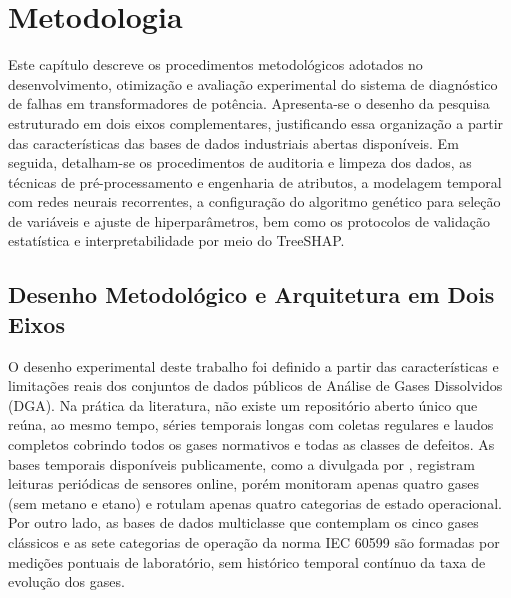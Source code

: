 \chapter{Metodologia}\label{cap:metodologia}

Este capítulo descreve os procedimentos metodológicos adotados no desenvolvimento, otimização e avaliação experimental do sistema de diagnóstico de falhas em transformadores de potência. Apresenta-se o desenho da pesquisa estruturado em dois eixos complementares, justificando essa organização a partir das características das bases de dados industriais abertas disponíveis. Em seguida, detalham-se os procedimentos de auditoria e limpeza dos dados, as técnicas de pré-processamento e engenharia de atributos, a modelagem temporal com redes neurais recorrentes, a configuração do algoritmo genético para seleção de variáveis e ajuste de hiperparâmetros, bem como os protocolos de validação estatística e interpretabilidade por meio do TreeSHAP.

\section{Desenho Metodológico e Arquitetura em Dois Eixos}\label{sec:desenho_metodologico}

O desenho experimental deste trabalho foi definido a partir das características e limitações reais dos conjuntos de dados públicos de Análise de Gases Dissolvidos (DGA). Na prática da literatura, não existe um repositório aberto único que reúna, ao mesmo tempo, séries temporais longas com coletas regulares e laudos completos cobrindo todos os gases normativos e todas as classes de defeitos. As bases temporais disponíveis publicamente, como a divulgada por , registram leituras periódicas de sensores online, porém monitoram apenas quatro gases (sem metano e etano) e rotulam apenas quatro categorias de estado operacional. Por outro lado, as bases de dados multiclasse que contemplam os cinco gases clássicos e as sete categorias de operação da norma IEC 60599 são formadas por medições pontuais de laboratório, sem histórico temporal contínuo da taxa de evolução dos gases.

